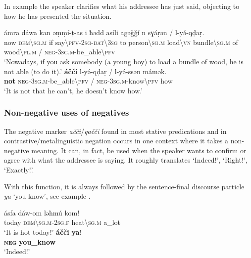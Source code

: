 \documentclass[output=paper,colorlinks,citecolor=brown]{langscibook}
\begin{document}
In example  the speaker clarifies what his addressee has just said, objecting to how he has presented the situation.

\ea\label{ex:siw:75}
\begin{xlist}[A: ]
        \gll ámra dáwa kan əṃṃí-ṭ-as i ħədd asíli agəǧǧí n sɣáṛən / l-yə́-qḍaṛ.  \\
             now \textsc{dem{\textbackslash}sg.m} if say{\textbackslash}\textsc{pfv-2sg-dat{\textbackslash}3sg} to person{\textbackslash}\textsc{sg.m} load{\textbackslash}\textsc{vn} bundle{\textbackslash}\textsc{sg.m} of wood{\textbackslash}\textsc{pl.m} / \textsc{neg}-3\textsc{sg.m}-be\_able{\textbackslash}\textsc{pfv} \\
        \glt ‘Nowadays, if you ask somebody (a young boy) to load a bundle of wood, he is not able (to do it).’
        \gll \textbf{áčči} l-yə́-qḍaṛ / l-yə́-ssən mámək. \\
             \textbf{not} \textsc{neg-3sg.m}{}-be\_able{\textbackslash}\textsc{pfv} / \textsc{neg}{}-3\textsc{sg.m}{}-know{\textbackslash}\textsc{pfv} how\\
        \glt ‘It is not that he can’t, he doesn’t know how.’
\end{xlist}
\z

\subsubsection{Non-negative uses of negatives}\label{sec:siw:4.6.2}

The negative marker \textit{ačči}/\textit{qačči} found in most stative predications and in contrastive/metalinguistic negation occurs in one context where it takes a non-negative meaning. It can, in fact, be used when the speaker wants to confirm or agree with what the addressee is saying. It roughly translates ‘Indeed!’, ‘Right!’, ‘Exactly!’.

With this function, it is always followed by the sentence-final discourse particle \textit{ya} ‘you know’, see example .

\ea\label{ex:siw:76}
\begin{xlist}[A: ]
        \gll ásfa dáw-om ləħm\'{u} kom!  \\
             today \textsc{dem{\textbackslash}sg.m-2sg.f} heat{\textbackslash}\textsc{sg.m} a\_lot \\
        \glt ‘It is hot today!’
        \gll \textbf{áčči} \textbf{ya}! \\
             \textbf{\textsc{neg}} \textbf{you\_know} \\
        \glt ‘Indeed!’
\end{xlist}
\z
\end{document}
